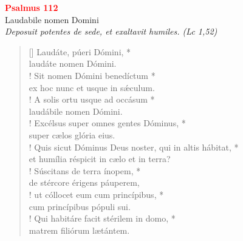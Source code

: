 





\vspace{0.3cm}
\begin{center}
 \textcolor{red}{\large \bf Psalmus 112}\\
Laudabile nomen Domini\\
\textit{\small Deposuit potentes de sede, et exaltavit humiles. (Lc 1,52)}
\end{center}
\begin{verse}[\versewidth]
Laudáte, púeri Dómini, *\\
laudáte nomen Dómini.\\!
\vin  Sit nomen Dómini benedíctum *\\
\vin  ex hoc nunc et usque in s\'{æ}culum.\\!
A solis ortu usque ad occásum *\\
laudábile nomen Dómini.\\!
\vin  Excélsus super omnes gentes Dóminus, *\\
\vin  super cælos glória eius.\\!  
Quis sicut Dóminus \verselinebreak Deus noster, qui in altis hábitat, *\\
et humília réspicit in cælo et in terra?\\!
\vin  Súscitans de terra ínopem, *\\
\vin  de stércore érigens páuperem,\\!
ut cóllocet eum cum princípibus, *\\
cum princípibus pópuli sui.\\!
\vin  Qui habitáre facit stérilem in domo, *\\
\vin  matrem filiórum lætántem.
\end{verse}
\vspace{1cm}